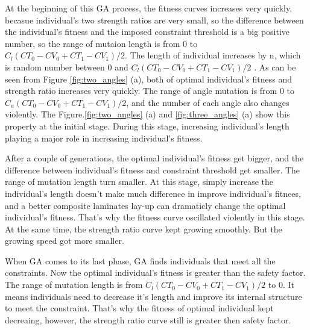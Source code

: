 At the beginning of this GA process, the fitness curves increases very quickly,
becasue individual's two strength ratios are very small, so the difference
between the individual's fitness and the imposed constraint threshold is a big
positive number, so the range of mutaion length is from 0 to $C_l(CT_0 - CV_0 +
CT_1 - CV_1)/2$.  The length of individual increases by n, which is random
number between 0 and $C_l(CT_0 - CV_0 + CT_1 - CV_1)/2$ . As can be seen from
Figure \ref{fig:two_angles} (a), both of optimal individual's fitness and
strength ratio increases very quickly.  The range of angle mutation is from 0 to
$C_a(CT_0 - CV_0 + CT_1 - CV_1)/2$, and the number of each angle also changes
violently. The Figure.\ref{fig:two_angles} (a) and \ref{fig:three_angles} (a) show
this property at the initial stage.  During this stage, increasing individual's length playing a
major role in increasing individual's fitness.

After a couple of generations, the optimal individual's fitness get bigger, and
the difference between individual's fitness and constraint threshold get
smaller. The range of mutation length turn smaller. At
this stage, simply increase the individual's length doesn't make much difference
in improve individual's fitnees, and a better composite laminates lay-up can
dramaticly change the optimal individual's fitness. That's why the fitness curve
oscillated violently in this stage.  At the same time, the strength ratio curve
kept growing smoothly. But the growing speed got more smaller.

When GA comes to its last phase, GA finds individuals that meet all the
constraints.  Now the optimal individual's fitness is greater than the safety
factor. The range of mutation length is from $C_l(CT_0 - CV_0 + CT_1 - CV_1)/2$
to 0. It means individuals need to decrease it's length and improve its internal
structure to meet the constraint. That's why the fitness of optimal individual
kept decreaing, however, the strength ratio curve still is greater then safety
factor.

